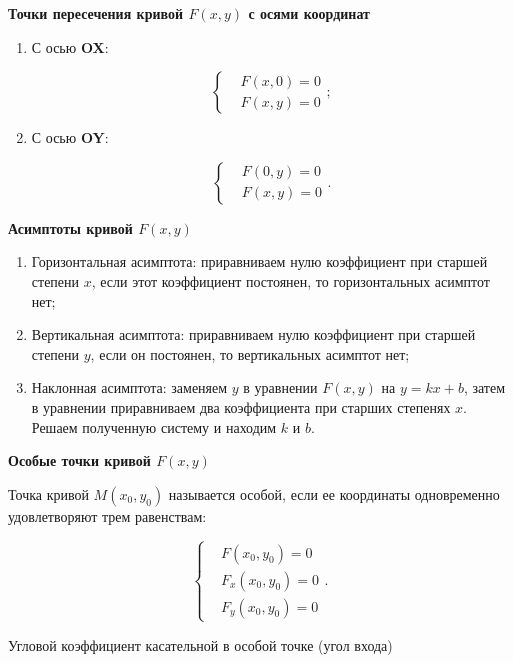 \textbf{Точки пересечения кривой $F \left( x, y \right)$ с осями координат}

\begin{enumerate}
	\item С осью \textbf{OX}:
	
	\[
	\begin{cases}
	& F \left( x, 0 \right) = 0\\
	& F \left( x, y \right) = 0
	\end{cases};
	\]
	
	\item С осью \textbf{OY}:
	
	\[
	\begin{cases}
	& F \left( 0, y \right) = 0\\
	& F \left( x, y \right) = 0
	\end{cases}.
	\]
	
\end{enumerate}

\textbf{Асимптоты кривой $F \left( x, y \right)$}

\begin{enumerate}
	\item Горизонтальная асимптота: приравниваем нулю коэффициент при старшей степени $x$, если этот коэффициент постоянен, то горизонтальных асимптот нет;
	
	\item Вертикальная асимптота: приравниваем нулю коэффициент при старшей степени $y$, если он постоянен, то вертикальных асимптот нет;
	
	\item Наклонная асимптота: заменяем $y$ в уравнении $F \left( x, y \right)$ на $y = k x + b$, затем в уравнении  приравниваем два коэффициента при старших степенях $x$. Решаем полученную систему и находим $k$ и $b$.
\end{enumerate}

\textbf{Особые точки кривой $F \left( x, y \right)$}

Точка  кривой $M \left( x_{0}, y_{0} \right)$ называется особой, если ее координаты одновременно удовлетворяют трем равенствам:

\[
\begin{cases}
& F \left( x_{0}, y_{0} \right) = 0\\
& F_{x} \left( x_{0}, y_{0} \right) = 0\\
& F_{y} \left( x_{0}, y_{0} \right) = 0
\end{cases}.
\]

Угловой коэффициент касательной в особой точке (угол входа)

